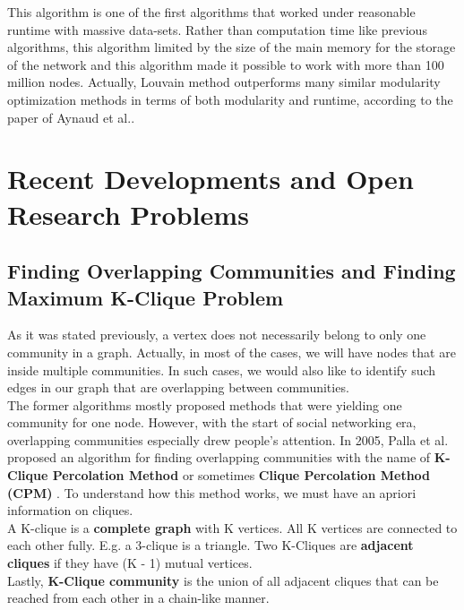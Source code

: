 \documentclass[10pt]{article}
\begin{document}
This algorithm is one of the first algorithms that worked under reasonable runtime with massive data-sets. Rather than computation time like previous algorithms, this algorithm limited by the size of the main memory for the storage of the network and this algorithm made it possible to work with more than 100 million nodes. Actually, Louvain method outperforms many similar modularity optimization methods in terms of both modularity and runtime, according to the paper of Aynaud et al.\cite{french}. \\

\section{Recent Developments and Open Research Problems}

\subsection{Finding Overlapping Communities and Finding Maximum K-Clique Problem}

As it was stated previously, a vertex does not necessarily belong to only one community in a graph. Actually, in most of the cases, we will have nodes that are inside multiple communities. In such cases, we would also like to identify such edges in our graph that are overlapping between communities. \\

The former algorithms mostly proposed methods that were yielding one community for one node. However, with the start of social networking era, overlapping communities especially drew people’s attention. In 2005, Palla et al. proposed an algorithm for finding overlapping communities with the name of \textbf{ K-Clique Percolation Method } or sometimes \textbf{ Clique Percolation Method (CPM) }. To understand how this method works, we must have an apriori information on cliques. \\

A K-clique is a \textbf{complete graph} with K vertices. All K vertices are connected to each other fully. E.g. a 3-clique is a triangle.
Two K-Cliques are \textbf{adjacent cliques} if they have (K - 1) mutual vertices. \\

Lastly, \textbf{K-Clique community} is the union of all adjacent cliques that can be reached from each other in a chain-like manner. \\
\end{document}
